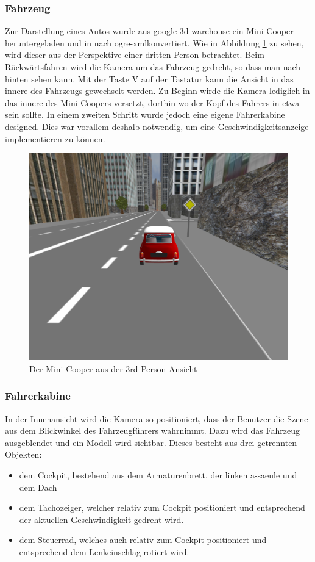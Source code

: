 \newpage
\subsubsection{Fahrzeug}
Zur Darstellung eines Autos wurde aus \gls{google-3d-warehouse} ein Mini Cooper heruntergeladen und in nach \gls{ogre-xml}konvertiert. Wie in Abbildung \ref{screenshot_minicooper} zu sehen, wird dieser aus der Perspektive einer dritten Person betrachtet. Beim Rückwärtsfahren wird die Kamera um das Fahrzeug gedreht, so dass man nach hinten sehen kann. Mit der Taste V auf der Tastatur kann die Ansicht in das innere des Fahrzeugs gewechselt werden. Zu Beginn wirde die Kamera lediglich in das innere des Mini Coopers versetzt, dorthin wo der Kopf des Fahrers in etwa sein sollte. In einem zweiten Schritt wurde jedoch eine eigene Fahrerkabine designed. Dies war vorallem deshalb notwendig, um eine Geschwindigkeitsanzeige implementieren zu können. 
\begin{figure}[H]
\centering 
\includegraphics[width=1\linewidth]{src/screenshot_minicooper.png}
\caption{Der Mini Cooper aus der 3rd-Person-Ansicht} %
\label{screenshot_minicooper} %
\end{figure}

\newpage
\subsubsection{Fahrerkabine}
In der Innenansicht wird die Kamera so positioniert, dass der Benutzer die Szene aus dem Blickwinkel des Fahrzeugführers wahrnimmt. Dazu wird das Fahrzeug ausgeblendet und ein Modell wird sichtbar. Dieses besteht aus drei getrennten Objekten:
\begin{itemize}
	\item dem Cockpit, bestehend aus dem Armaturenbrett, der linken \gls{a-saeule} und dem Dach
	\item dem Tachozeiger, welcher relativ zum Cockpit positioniert und entsprechend der aktuellen Geschwindigkeit gedreht wird.
	\item dem Steuerrad, welches auch relativ zum Cockpit positioniert und entsprechend dem Lenkeinschlag rotiert wird.
\end{itemize}

